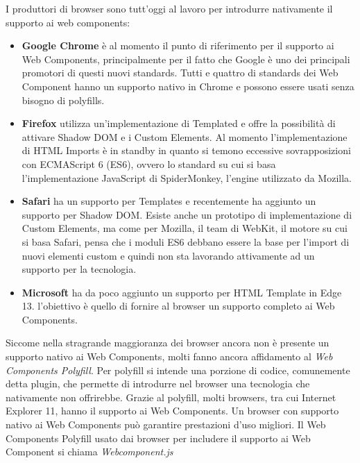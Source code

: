 I produttori di browser sono tutt’oggi al lavoro per introdurre nativamente il supporto ai web components:
\begin{itemize}
\item \textbf{Google Chrome} è al momento il punto di riferimento per il supporto ai Web Components, principalmente per il fatto che Google è uno dei principali promotori di questi nuovi standards. Tutti e quattro di standards dei Web Component hanno un supporto nativo in Chrome e possono essere usati senza bisogno di polyfills. 
\item \textbf{Firefox} utilizza un’implementazione di Templated e offre la possibilità di attivare Shadow DOM e i Custom Elements. Al momento l’implementazione di HTML Imports è in standby in quanto si temono eccessive sovrapposizioni con ECMAScript 6 (ES6), ovvero lo standard su cui si basa l’implementazione JavaScript di SpiderMonkey, l’engine utilizzato da Mozilla. 
\item \textbf{Safari} ha un supporto per Templates e recentemente ha aggiunto un supporto per Shadow DOM. Esiste anche un prototipo di implementazione di Custom Elements, ma come per Mozilla, il team di WebKit, il motore su cui si basa Safari, pensa che i moduli ES6 debbano essere la base per l’import di nuovi elementi custom e quindi non sta lavorando attivamente ad un supporto per la tecnologia.
\item \textbf{Microsoft} ha da poco aggiunto un supporto per HTML Template in Edge 13. l’obiettivo è quello di fornire al browser un supporto completo ai Web Components.
\end{itemize}
Siccome nella stragrande maggioranza dei browser ancora non è presente un supporto nativo ai Web Components, molti fanno ancora affidamento al \emph{Web Components Polyfill}.
Per polyfill si intende una porzione di codice, comunemente detta plugin, che permette di introdurre nel browser una tecnologia che nativamente non offrirebbe. 
Grazie al polyfill, molti browsers, tra cui Internet Explorer 11, hanno il supporto ai Web Components. 
Un browser con supporto nativo ai Web Components può garantire prestazioni d’uso migliori. Il Web Components Polyfill usato dai browser per includere il supporto ai Web Component si chiama \emph{Webcomponent.js}

